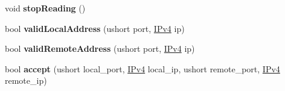 \begin{DoxyCompactItemize}
\item 
void {\bfseries stop\+Reading} ()\hypertarget{structudp_1_1Socket_ac2660137ceca93fe8e49037cf2627195}{}\label{structudp_1_1Socket_ac2660137ceca93fe8e49037cf2627195}

\item 
bool {\bfseries valid\+Local\+Address} (ushort port, \hyperlink{structIPv4}{I\+Pv4} ip)\hypertarget{structudp_1_1Socket_a689917ee204053203b09b7c74c872186}{}\label{structudp_1_1Socket_a689917ee204053203b09b7c74c872186}

\item 
bool {\bfseries valid\+Remote\+Address} (ushort port, \hyperlink{structIPv4}{I\+Pv4} ip)\hypertarget{structudp_1_1Socket_a15a198ff05352aecfb66c27956429b4c}{}\label{structudp_1_1Socket_a15a198ff05352aecfb66c27956429b4c}

\item 
bool {\bfseries accept} (ushort local\+\_\+port, \hyperlink{structIPv4}{I\+Pv4} local\+\_\+ip, ushort remote\+\_\+port, \hyperlink{structIPv4}{I\+Pv4} remote\+\_\+ip)\hypertarget{structudp_1_1Socket_ae0adf9be402d19720ad59dfccd57fb99}{}\label{structudp_1_1Socket_ae0adf9be402d19720ad59dfccd57fb99}

\end{DoxyCompactItemize}
